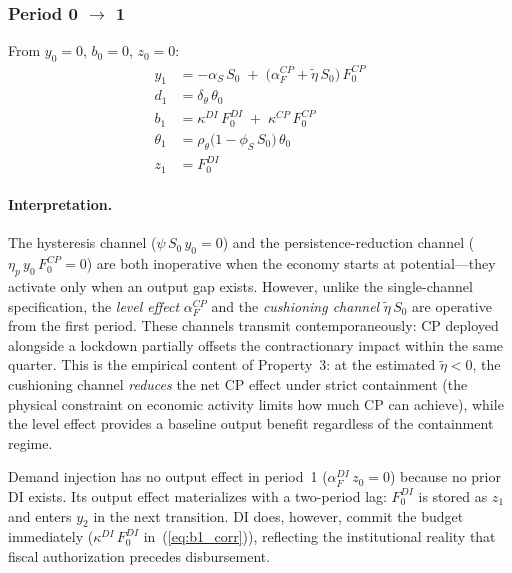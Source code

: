 \documentclass[12pt, a4paper]{article}
\begin{document}
\subsubsection*{Period 0 $\to$ 1}

From $y_0 = 0$, $b_0 = 0$, $z_0 = 0$:
%
\begin{align}
    y_1 &= -\alpha_S\, S_0
          \;+\; \bigl(\alpha_F^{CP} + \tilde{\eta}\, S_0\bigr)\, F_0^{CP}
    \label{eq:y1_corr} \\[4pt]
    d_1 &= \delta_\theta\, \theta_0
    \label{eq:d1_corr} \\[4pt]
    b_1 &= \kappa^{DI}\, F_0^{DI} \;+\; \kappa^{CP}\, F_0^{CP}
    \label{eq:b1_corr} \\[4pt]
    \theta_1 &= \rho_\theta\bigl(1 - \phi_S\, S_0\bigr)\, \theta_0
    \label{eq:theta1_corr} \\[4pt]
    z_1 &= F_0^{DI}
    \label{eq:z1_corr}
\end{align}

\paragraph{Interpretation.}
The hysteresis channel ($\psi\, S_0\, y_0 = 0$) and the persistence-reduction
channel ($\eta_p\, y_0\, F_0^{CP} = 0$) are both inoperative when the economy
starts at potential---they activate only when an output gap exists. However,
unlike the single-channel specification, the \textit{level effect}
$\alpha_F^{CP}$ and the \textit{cushioning channel}
$\tilde{\eta}\, S_0$ are operative from the first period. These
channels transmit contemporaneously: CP deployed alongside a lockdown partially
offsets the contractionary impact within the same quarter. This is the
empirical content of Property~3: at the estimated
$\tilde{\eta} < 0$, the cushioning channel \textit{reduces} the net CP
effect under strict containment (the physical constraint on economic activity
limits how much CP can achieve), while the level effect provides a baseline
output benefit regardless of the containment regime.

Demand injection has no output effect in period~1 ($\alpha_F^{DI}\, z_0 = 0$)
because no prior DI exists. Its output effect materializes with a two-period
lag: $F_0^{DI}$ is stored as $z_1$ and enters $y_2$ in the next transition. DI
does, however, commit the budget immediately ($\kappa^{DI}\, F_0^{DI}$
in~(\ref{eq:b1_corr})), reflecting the institutional reality that fiscal
authorization precedes disbursement.
\end{document}
